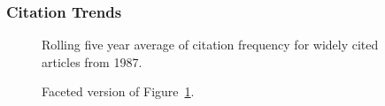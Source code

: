 \documentclass[
  10pt,
  letterpaper,
  DIV=11,
  numbers=noendperiod,
  twoside]{scrartcl}
\begin{document}
\subsubsection*{Citation Trends}\label{citation-trends-11}

\begin{figure}


\caption{\label{fig-citation-spaghetti-1987}Rolling five year average of
citation frequency for widely cited articles from 1987.}

\end{figure}%

\begin{figure}


\caption{\label{fig-citation-facet-1987}Faceted version of
Figure~\ref{fig-citation-spaghetti-1987}.}

\end{figure}%
\end{document}
